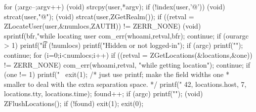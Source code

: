\begin{code}
{        for (;argc--;argv++) {
                (void) strcpy(user,*argv);
                if (!index(user,'@')) {
                        (void) strcat(user,"@");
                        (void) strcat(user,ZGetRealm());
                } 
                if ((retval = ZLocateUser(user,&numlocs,ZAUTH)) != ZERR_NONE) {
                        (void) sprintf(bfr,"while locating user %
                        com_err(whoami,retval,bfr);
                        continue;
                }
                if (ourargc > 1)
                        printf("\t%
                if (!numlocs) {
                        printf("Hidden or not logged-in\n");
                        if (argc)
                                printf("\n");
                        continue;
                }
                for (i=0;i<numlocs;i++) {
                        if ((retval = ZGetLocations(&locations,&one))
                            != ZERR_NONE) {
                                com_err(whoami,retval,
                                        "while getting location");
                                continue;
                        }
                        if (one != 1) {
                                printf("\
                                exit(1);
                        }
                        /* just use printf; make the field widths one
                         * smaller to deal with the extra separation space.
                         */
                        printf("%
                               42, locations.host,
                               7, locations.tty,
                               locations.time);
                        found++;
                }
                if (argc)
                        printf("\n");
                (void) ZFlushLocations();
        }
        if (!found)
            exit(1);
        exit(0);
}
\end{code}
